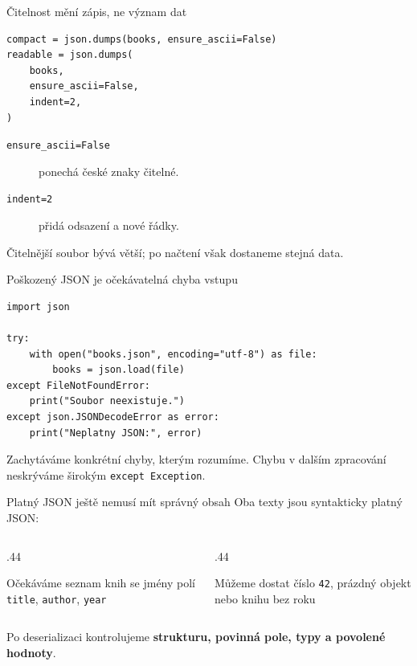 \documentclass[aspectratio=169]{beamer}
\newcommand{\term}[1]{\textcolor{CodeBlue}{\textbf{#1}}}
\begin{document}
\begin{frame}[fragile]{Čitelnost mění zápis, ne význam dat}
\begin{lstlisting}[style=pythonSmall]
compact = json.dumps(books, ensure_ascii=False)
readable = json.dumps(
    books,
    ensure_ascii=False,
    indent=2,
)
\end{lstlisting}
  \begin{description}
    \item[\texttt{ensure\_ascii=False}] ponechá české znaky čitelné.
    \item[\texttt{indent=2}] přidá odsazení a nové řádky.
  \end{description}
  Čitelnější soubor bývá větší; po načtení však dostaneme stejná data.
\end{frame}

\begin{frame}[fragile]{Poškozený JSON je očekávatelná chyba vstupu}
\begin{lstlisting}[style=pythonSmall]
import json

try:
    with open("books.json", encoding="utf-8") as file:
        books = json.load(file)
except FileNotFoundError:
    print("Soubor neexistuje.")
except json.JSONDecodeError as error:
    print("Neplatny JSON:", error)
\end{lstlisting}
  Zachytáváme konkrétní chyby, kterým rozumíme. Chybu v dalším zpracování neskrýváme širokým \texttt{except Exception}.
\end{frame}

\begin{frame}{Platný JSON ještě nemusí mít správný obsah}
  Oba texty jsou syntakticky platný JSON:
  \begin{columns}[T]
    \begin{column}{.44\textwidth}
      \begin{block}{Očekáváme}
        seznam knih se jmény polí \texttt{title}, \texttt{author}, \texttt{year}
      \end{block}
    \end{column}
    \begin{column}{.44\textwidth}
      \begin{alertblock}{Můžeme dostat}
        číslo \texttt{42}, prázdný objekt nebo knihu bez roku
      \end{alertblock}
    \end{column}
  \end{columns}
  \vspace{5mm}

  Po deserializaci kontrolujeme \term{strukturu, povinná pole, typy a povolené hodnoty}.
\end{frame}
\end{document}
